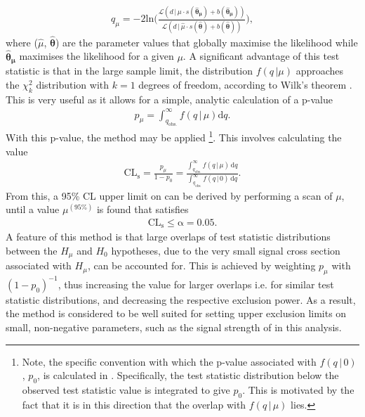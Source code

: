 \begin{align}
    \label{test_statistic}
 q_{\mu} = -2 \mathrm{ln}\Bigg(\frac{\mathcal{L} (d \, | \, \mu \cdot s(\bm{\hat{\theta}_{\mu}}) + b(\bm{\hat{\theta}_{\mu}}))}{\mathcal{L} (d \, | \, \hat{\mu} \cdot s(\bm{\hat{\theta}}) + b(\bm{\hat{\theta}}))} \Bigg),
\end{align}
where ($\hat{\mu}$, $\hat{\bm{\theta}}$) are the parameter values that globally maximise the likelihood while $\bm{\hat{\theta}_{\mu}}$ maximises the likelihood for a given $\mu$. A significant advantage of this test statistic is that in the large sample limit, the distribution $f(q \, | \mu)$ approaches the $\chi^2_k$ distribution with $k=1$ degrees of freedom, according to Wilk's theorem \cite{Cowan_2011}. This is very useful as it allows for a simple, analytic calculation of a p-value 
\begin{align}
    p_{\mu} = \int_{q_{\mathrm{obs.}}}^{\infty} f(q \, | \, \mu) \mathrm{d}q.
\end{align}
With this p-value, the \CLs method may be applied \cite{CLs}\footnote{Note, the specific convention with which the p-value associated with $f(q \, | \, 0)$, $p_0$, is calculated in \cite{CLs}. Specifically, the test statistic distribution below the observed test statistic value is integrated to give $p_0$. This is motivated by the fact that it is in this direction that the overlap with $f(q \, | \, \mu)$ lies.}. This involves calculating the value 
\begin{align}
    \mathrm{CL_s} = \frac{p_{\mu}}{1 - p_0} = \frac{\int_{q_{\mathrm{obs.}}}^{\infty} f( q \, | \, \mu) \, \mathrm{d}q}{\int_{q_{\mathrm{obs.}}}^{\infty} f( q \, | \, 0) \, \mathrm{d}q} .
\end{align}
From this, a 95\% CL upper limit on \sBR can be derived by performing a scan of $\mu$, until a value $\mu^{(95\%)}$ is found that satisfies 
\begin{align}
    \mathrm{CL_s \leq \alpha = 0.05}.
\end{align} 
A feature of this method is that large overlaps of test statistic distributions between the $H_{\mu}$ and $H_{0}$ hypotheses, due to the very small signal cross section associated with $H_{\mu}$, can be accounted for. This is achieved by weighting $p_{\mu}$ with $(1 - p_{0})^{-1}$, thus increasing the \CLs value for larger overlaps i.e. for similar test statistic distributions, and decreasing the respective exclusion power. As a result, the \CLs method is considered to be well suited for setting upper exclusion limits on small, non-negative parameters, such as the signal strength of \sBR in this analysis. 

